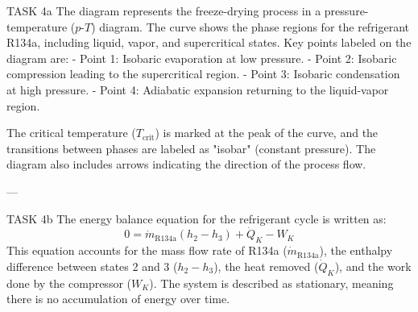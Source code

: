 TASK 4a  
The diagram represents the freeze-drying process in a pressure-temperature (\(p\)-\(T\)) diagram. The curve shows the phase regions for the refrigerant R134a, including liquid, vapor, and supercritical states. Key points labeled on the diagram are:  
- Point 1: Isobaric evaporation at low pressure.  
- Point 2: Isobaric compression leading to the supercritical region.  
- Point 3: Isobaric condensation at high pressure.  
- Point 4: Adiabatic expansion returning to the liquid-vapor region.  

The critical temperature (\(T_{\text{crit}}\)) is marked at the peak of the curve, and the transitions between phases are labeled as "isobar" (constant pressure). The diagram also includes arrows indicating the direction of the process flow.

---

TASK 4b  
The energy balance equation for the refrigerant cycle is written as:  
\[
0 = \dot{m}_{\text{R134a}} \left( h_2 - h_3 \right) + \dot{Q}_K - W_K
\]  
This equation accounts for the mass flow rate of R134a (\(\dot{m}_{\text{R134a}}\)), the enthalpy difference between states 2 and 3 (\(h_2 - h_3\)), the heat removed (\(\dot{Q}_K\)), and the work done by the compressor (\(W_K\)). The system is described as stationary, meaning there is no accumulation of energy over time.